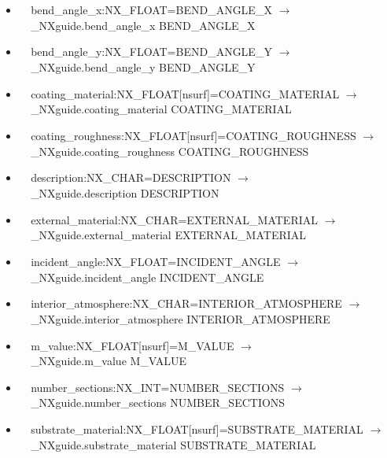 \documentclass[11pt]{article}
\begin{document}
{{\begin{itemize}
\item{\verb|  |bend\_angle\_x:NX\_FLOAT=BEND\_ANGLE\_X $\rightarrow$\\
\verb|  |\_NXguide.bend\_angle\_x BEND\_ANGLE\_X}

\item{\verb|  |bend\_angle\_y:NX\_FLOAT=BEND\_ANGLE\_Y $\rightarrow$\\
\verb|  |\_NXguide.bend\_angle\_y BEND\_ANGLE\_Y}

\item{\verb|  |coating\_material:NX\_FLOAT[nsurf]=COATING\_MATERIAL $\rightarrow$\\
\verb|  |\_NXguide.coating\_material COATING\_MATERIAL}

\item{\verb|  |coating\_roughness:NX\_FLOAT[nsurf]=COATING\_ROUGHNESS $\rightarrow$\\
\verb|  |\_NXguide.coating\_roughness COATING\_ROUGHNESS}

\item{\verb|  |description:NX\_CHAR=DESCRIPTION $\rightarrow$\\
\verb|  |\_NXguide.description DESCRIPTION}

\item{\verb|  |external\_material:NX\_CHAR=EXTERNAL\_MATERIAL $\rightarrow$\\
\verb|  |\_NXguide.external\_material EXTERNAL\_MATERIAL}

\item{\verb|  |incident\_angle:NX\_FLOAT=INCIDENT\_ANGLE $\rightarrow$\\
\verb|  |\_NXguide.incident\_angle INCIDENT\_ANGLE}

\item{\verb|  |interior\_atmosphere:NX\_CHAR=INTERIOR\_ATMOSPHERE $\rightarrow$\\
\verb|  |\_NXguide.interior\_atmosphere INTERIOR\_ATMOSPHERE}

\item{\verb|  |m\_value:NX\_FLOAT[nsurf]=M\_VALUE $\rightarrow$\\
\verb|  |\_NXguide.m\_value M\_VALUE}

\item{\verb|  |number\_sections:NX\_INT=NUMBER\_SECTIONS $\rightarrow$\\
\verb|  |\_NXguide.number\_sections NUMBER\_SECTIONS}

\item{\verb|  |substrate\_material:NX\_FLOAT[nsurf]=SUBSTRATE\_MATERIAL $\rightarrow$\\
\verb|  |\_NXguide.substrate\_material SUBSTRATE\_MATERIAL}


\end{itemize}}}
\end{document}
